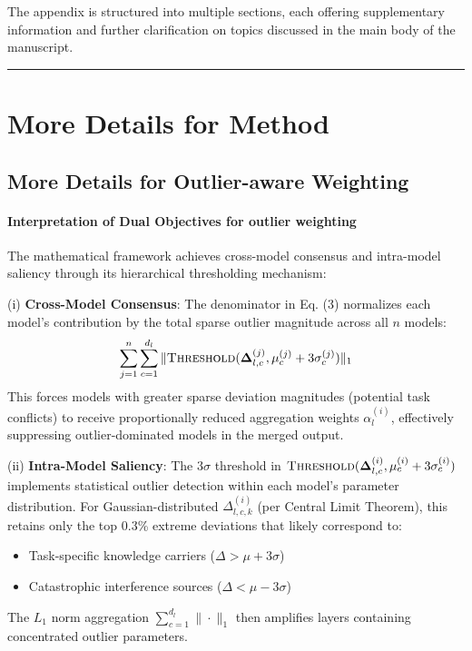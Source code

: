 \newpage
\appendix
\onecolumn

The appendix is structured into multiple sections, each offering supplementary information and further clarification on topics discussed in the main body of the manuscript. 

\startcontents[sections]  %
\vskip 0.2in
\hrule

\section{More Details for Method}\label{appendix_method}
\subsection{More Details for Outlier-aware Weighting}\label{app:outlier}
\paragraph{Interpretation of Dual Objectives for outlier weighting}
The mathematical framework achieves cross-model consensus and intra-model saliency through its hierarchical thresholding mechanism:

(i) \textbf{Cross-Model Consensus}:
The denominator in Eq. (3) normalizes each model's contribution by the total sparse outlier magnitude across all $n$ models:
\begin{equation}
    \sum_{j=1}^n \sum_{c=1}^{d_l} \|\textsc{Threshold}(\bm{\Delta}_{l,c}^{(j)}, \mu_c^{(j)}+3\sigma_c^{(j)})\|_1
\end{equation}
This forces models with greater sparse deviation magnitudes (potential task conflicts) to receive proportionally reduced aggregation weights $\alpha_l^{(i)}$, effectively suppressing outlier-dominated models in the merged output.

(ii) \textbf{Intra-Model Saliency}:
The $3\sigma$ threshold in $\textsc{Threshold}(\bm{\Delta}_{l,c}^{(i)}, \mu_c^{(i)}+3\sigma_c^{(i)})$ implements statistical outlier detection within each model's parameter distribution. For Gaussian-distributed $\Delta_{l,c,k}^{(i)}$ (per Central Limit Theorem), this retains only the top 0.3\% extreme deviations that likely correspond to:
\begin{itemize}
    \item Task-specific knowledge carriers ($\Delta > \mu+3\sigma$)
    \item Catastrophic interference sources ($\Delta < \mu-3\sigma$)
\end{itemize}
The $L_1$ norm aggregation $\sum_{c=1}^{d_l}\|\cdot\|_1$ then amplifies layers containing concentrated outlier parameters.

